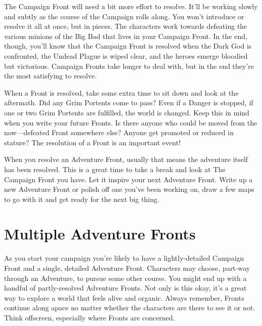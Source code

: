        

The Campaign Front will need a bit more effort to resolve. It’ll be working slowly and subtly as the course of the Campaign rolls along. You won’t introduce or resolve it all at once, but in pieces. The characters work towards defeating the various minions of the Big Bad that lives in your Campaign Front. In the end, though, you’ll know that the Campaign Front is resolved when the Dark God is confronted, the Undead Plague is wiped clear, and the heroes emerge bloodied but victorious. Campaign Fronts take longer to deal with, but in the end they’re the most satisfying to resolve.

       

When a Front is resolved, take some extra time to sit down and look at the aftermath. Did any Grim Portents come to pass? Even if a Danger is stopped, if one or two Grim Portents are fulfilled, the world is changed. Keep this in mind when you write your future Fronts. Is there anyone who could be moved from the now—defeated Front somewhere else? Anyone get promoted or reduced in stature? The resolution of a Front is an important event!

       

When you resolve an Adventure Front, usually that means the adventure itself has been resolved. This is a great time to take a break and look at The Campaign Front you have. Let it inspire your next Adventure Front. Write up a new Adventure Front or polish off one you’ve been working on, draw a few maps to go with it and get ready for the next big thing.

       
\section{Multiple Adventure Fronts}     
       

As you start your campaign you're likely to have a lightly-detailed Campaign Front and a single, detailed Adventure Front. Characters may choose, part-way through an Adventure, to pursue some other course. You might end up with a handful of partly-resolved Adventure Fronts. Not only is this okay, it's a great way to explore a world that feels alive and organic. Always remember, Fronts continue along apace no matter whether the characters are there to see it or not. Think offscreen, especially where Fronts are concerned.

       

